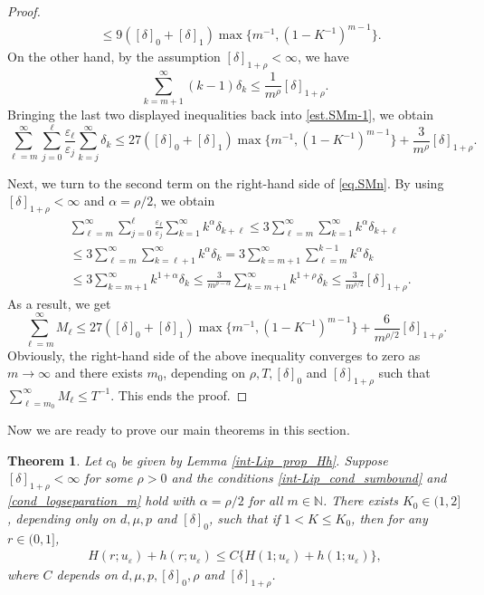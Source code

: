 \documentclass[reqno,12pt]{amsart} %
\newtheorem{theorem}{Theorem}[section]
\theoremstyle{definition}
\theoremstyle{remark}
\numberwithin{equation}{section}
\newcommand{\N}{\mathbb{N}}
\begin{document}
\begin{proof}
\begin{equation*}
\begin{aligned}
        &\leq 9 ([\delta]_0+[\delta]_1)\max\{m^{-1}, (1-K^{-1})^{m-1}\}.
        \end{aligned}
    \end{equation*}
    On the other hand, by the assumption $[\delta]_{1+\rho} < \infty$, we have
    \begin{equation*}
        \sum_{k=m+1}^\infty (k-1)\delta_k \le \frac{1}{m^\rho}[\delta]_{1+\rho}.
    \end{equation*}
    Bringing the last two displayed inequalities back into \eqref{est.SMm-1}, we obtain
    \begin{equation*}
        \sum_{\ell=m}^\infty \sum_{j=0}^{\ell}\frac{\varepsilon_\ell} {\varepsilon_j}\sum_{k=j}^\infty\delta_k \le 27([\delta]_0+[\delta]_1)\max\{m^{-1}, (1-K^{-1})^{m-1}\}+\frac{3}{m^\rho}[\delta]_{1+\rho}.
    \end{equation*}

    Next, we turn to the second term on the right-hand side of \eqref{eq.SMn}. By using $[\delta]_{1+\rho} < \infty$ and $\alpha = \rho/2$, we obtain
    \begin{align*}
        &\sum_{\ell=m}^\infty \sum_{j=0}^\ell \frac{\varepsilon_\ell}{\varepsilon_j}\sum_{k=1}^\infty k^\alpha\delta_{k+\ell}\leq 3\sum_{\ell=m}^\infty\sum_{k=1}^\infty k^\alpha\delta_{k+\ell}\\
        & \le 3\sum_{\ell=m}^\infty\sum_{k=\ell+1}^\infty k^\alpha\delta_{k}= 3\sum_{k=m+1}^\infty\sum_{\ell=m}^{k-1} k^\alpha\delta_{k} \\
        &\leq 3\sum_{k=m+1}^\infty k^{1+\alpha}\delta_k\leq \frac{3}{m^{\rho-\alpha}}\sum_{k=m+1}^\infty k^{1+\rho}\delta_k\leq \frac{3}{m^{\rho/2}}[\delta]_{1+\rho}.
    \end{align*}
    As a result, we get
    \begin{equation*}
        \sum_{\ell = m}^\infty M_\ell \le 27 ([\delta]_0+[\delta]_1)\max\{m^{-1}, (1-K^{-1})^{m-1}\}+\frac{6}{m^{\rho/2}}[\delta]_{1+\rho}.
    \end{equation*}
    Obviously, the right-hand side of the above inequality converges to zero as $m\to \infty$ and there exists $m_0$, depending on $\rho, T, [\delta]_0$ and $[\delta]_{1+\rho}$ such that $\sum_{\ell = m_0}^\infty M_\ell \le T^{-1}$. This ends the proof.
\end{proof}

Now we are ready to prove our main theorems in this section.

\begin{theorem}\label{thm_Hh_bound}
  Let $c_0$ be given by Lemma \ref{int-Lip_prop_Hh}. Suppose $[\delta]_{1+\rho}<\infty$ for some $\rho>0$ and the conditions \eqref{int-Lip_cond_sumbound} and \eqref{cond_logseparation_m} hold with $\alpha=\rho/2$ for all $m \in \N$. There exists $K_0\in(1, 2]$, depending only on $d, \mu, p$ and $[\delta]_0$, such that if $1<K\leq K_0$, then for any $r\in(0, 1]$,
  \begin{align*}
    H(r; u_\varepsilon)+h(r; u_\varepsilon)\leq C\{H(1; u_\varepsilon)+h(1; u_\varepsilon)\},
  \end{align*}
  where $C$ depends on $d, \mu, p, [\delta]_0, \rho$ and $[\delta]_{1+\rho}$.
\end{theorem}
\end{document}
